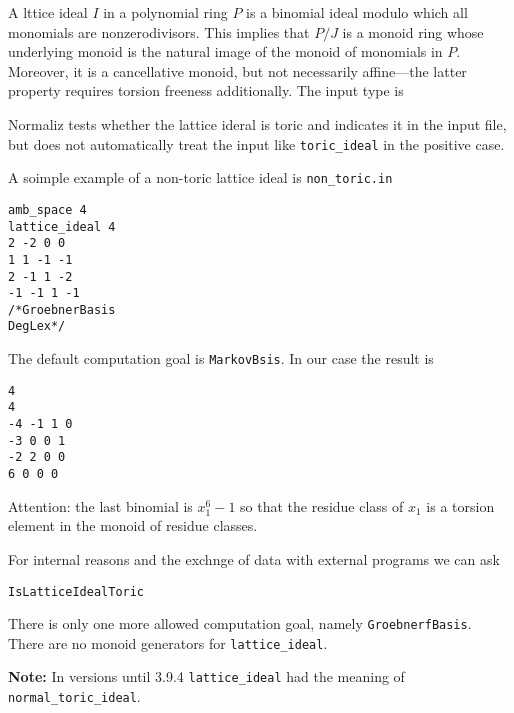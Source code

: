 A lttice ideal $I$ in a polynomial ring $P$ is a binomial ideal modulo which all monomials are nonzerodivisors. This implies that $P/J$ is a monoid ring whose underlying monoid is the natural image of the monoid of monomials in $P$. Moreover, it is a cancellative monoid, but not necessarily affine---the latter property requires torsion freeness additionally. The input type is
\begin{itemize}
\end{itemize}
Normaliz tests whether the lattice ideral is toric and indicates it in the input file, but does not automatically treat the input like \verb|toric_ideal| in the positive case.

A soimple example of a non-toric lattice ideal is \verb|non_toric.in|
\begin{Verbatim}
amb_space 4
lattice_ideal 4
2 -2 0 0
1 1 -1 -1
2 -1 1 -2
-1 -1 1 -1
/*GroebnerBasis
DegLex*/
\end{Verbatim}
The default computation goal is \verb|MarkovBsis|. In our case the result is
\begin{Verbatim}
4
4
-4 -1 1 0 
-3 0 0 1 
-2 2 0 0 
6 0 0 0
\end{Verbatim}
Attention: the last binomial is $x_1^6-1$ so that the residue class of $x_1$ is a torsion element in the monoid of residue classes.

For internal reasons and the exchnge of data with external programs we can ask
\begin{Verbatim}
IsLatticeIdealToric
\end{Verbatim}

There is only one more allowed computation goal, namely \verb|GroebnerfBasis|. There are no monoid generators for \verb|lattice_ideal|.

\textbf{Note:} In versions until 3.9.4 \verb|lattice_ideal| had the meaning of \verb|normal_toric_ideal|.